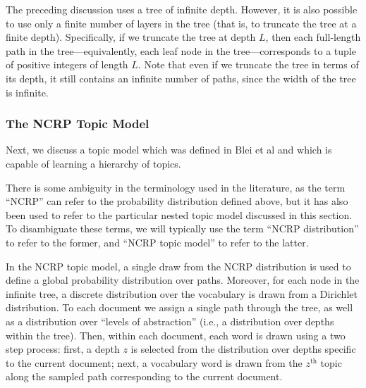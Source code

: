 \documentclass{article}
\newcommand{\nth}{^{\text{th}}}
\begin{document}
The preceding discussion uses a tree of infinite depth.
However, it is also possible to use only a finite number of layers in the tree (that is, to truncate the tree at a finite depth).
Specifically, if we truncate the tree at depth $L$, then each full-length path in the tree---equivalently, each leaf node in the tree---corresponds to a tuple of positive integers of length $L$.
Note that even if we truncate the tree in terms of its depth, it still contains an infinite number of paths, since the width of the tree is infinite.

\subsubsection{The NCRP Topic Model}

Next, we discuss a topic model which was defined in Blei et al \cite{blei2010ncrp} and which is capable of learning a hierarchy of topics.

There is some ambiguity in the terminology used in the literature, as the term ``NCRP'' can refer to the probability distribution defined above, but it has also been used to refer to the particular nested topic model discussed in this section.
To disambiguate these terms, we will typically use the term ``NCRP distribution'' to refer to the former, and ``NCRP topic model'' to refer to the latter.

In the NCRP topic model, a single draw from the NCRP distribution is used to define a global probability distribution over paths.
Moreover, for each node in the infinite tree, a discrete distribution over the vocabulary is drawn from a Dirichlet distribution.
To each document we assign a single path through the tree, as well as a distribution over ``levels of abstraction'' (i.e., a distribution over depths within the tree).
Then, within each document, each word is drawn using a two step process: first, a depth $z$ is selected from the distribution over depths specific to the current document; next, a vocabulary word is drawn from the $z\nth$ topic along the sampled path corresponding to the current document.
\end{document}
